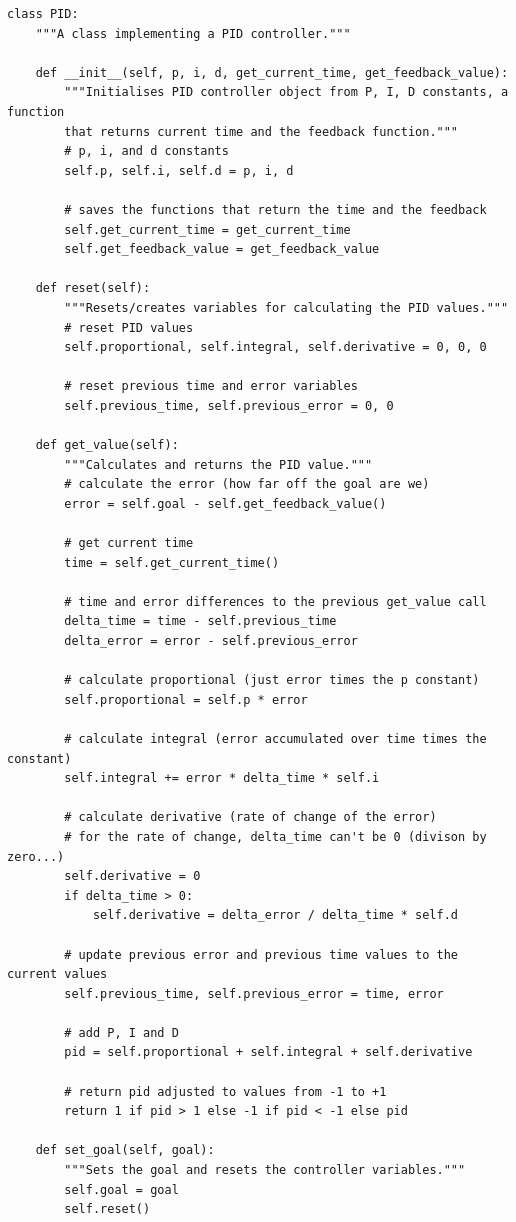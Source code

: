 \documentclass[12pt,twoside]{article}
\begin{document}
\begin{verbatim}
class PID:
    """A class implementing a PID controller."""

    def __init__(self, p, i, d, get_current_time, get_feedback_value):
        """Initialises PID controller object from P, I, D constants, a function
        that returns current time and the feedback function."""
        # p, i, and d constants
        self.p, self.i, self.d = p, i, d

        # saves the functions that return the time and the feedback
        self.get_current_time = get_current_time
        self.get_feedback_value = get_feedback_value

    def reset(self):
        """Resets/creates variables for calculating the PID values."""
        # reset PID values
        self.proportional, self.integral, self.derivative = 0, 0, 0

        # reset previous time and error variables
        self.previous_time, self.previous_error = 0, 0

    def get_value(self):
        """Calculates and returns the PID value."""
        # calculate the error (how far off the goal are we)
        error = self.goal - self.get_feedback_value()

        # get current time
        time = self.get_current_time()

        # time and error differences to the previous get_value call
        delta_time = time - self.previous_time
        delta_error = error - self.previous_error

        # calculate proportional (just error times the p constant)
        self.proportional = self.p * error

        # calculate integral (error accumulated over time times the constant)
        self.integral += error * delta_time * self.i

        # calculate derivative (rate of change of the error)
        # for the rate of change, delta_time can't be 0 (divison by zero...)
        self.derivative = 0
        if delta_time > 0:
            self.derivative = delta_error / delta_time * self.d

        # update previous error and previous time values to the current values
        self.previous_time, self.previous_error = time, error

        # add P, I and D
        pid = self.proportional + self.integral + self.derivative

        # return pid adjusted to values from -1 to +1
        return 1 if pid > 1 else -1 if pid < -1 else pid

    def set_goal(self, goal):
        """Sets the goal and resets the controller variables."""
        self.goal = goal
        self.reset()
\end{verbatim}
\end{document}
